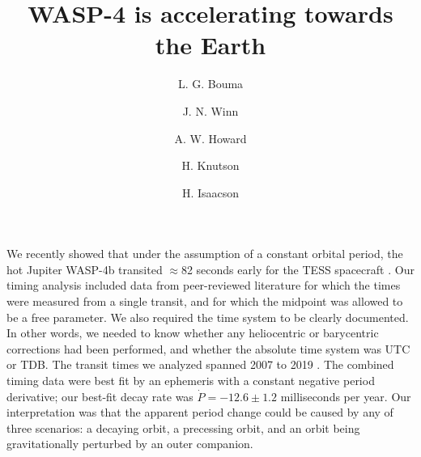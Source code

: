 \documentclass[RNAAS]{aastex62}
\begin{document}
\title{WASP-4 is accelerating towards the Earth}


\author[0000-0002-0514-5538]{L. G. Bouma}
%
\author[0000-0002-4265-047X]{J. N. Winn}
%
\author[0000-0001-8638-0320]{A. W. Howard}
%
\author{H. Knutson}
%
\author[0000-0002-0531-1073]{H. Isaacson}
%



\section{}

We recently showed that under the assumption of a constant orbital
period, the hot Jupiter WASP-4b transited
$\approx$82 seconds early for the TESS spacecraft 
\citep{bouma_wasp-4b_2019}.  Our timing
analysis included data from peer-reviewed literature for which the
times were measured from a single transit, and for which the midpoint
was allowed to be a free parameter. We also required the time system
to be clearly documented. In other words, we needed to know whether
any heliocentric or barycentric corrections had been performed, and
whether the absolute time system was UTC or TDB. The transit times
we analyzed spanned 2007 to 2019 
\citep{wilson_wasp-4b_2008,gillon_improved_2009,winn_transit_2009,dragomir_terms_2011,sanchis-ojeda_starspots_2011,nikolov_wasp-4b_2012,hoyer_tramos_2013,ranjan_atmospheric_2014,huitson_gemini_2017}.
The combined timing data were best fit by
an ephemeris with a constant negative period derivative; our best-fit
decay rate was $\dot{P} = -12.6 \pm 1.2$ milliseconds per year.  Our
interpretation was that the apparent period change could be caused by
any of three scenarios: a decaying orbit, a precessing orbit, and an
orbit being gravitationally perturbed by an outer companion.
\end{document}

